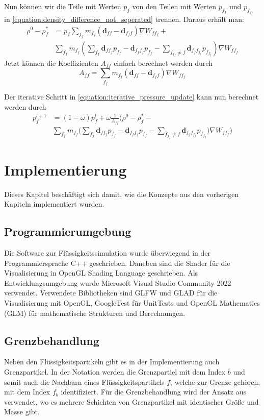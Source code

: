 \documentclass{scrreprt}
\begin{document}
Nun können wir die Teile mit Werten $p_f$ von den Teilen mit Werten $p_{f_f}$ und $p_{f_{f_f}}$ in \eqref{equation:density_difference_not_seperated} trennen.  
Daraus erhält man:
\begin{align}
    \rho^0 - \rho_f^* &= p_f \sum_{f_f} m_{f_f} \left(\textbf{d}_{ff} - \textbf{d}_{f_f f}\right)  \nabla W_{ff_f} +\\
    & \sum_{f_f} m_{f_f} \left(\sum_{f_f} \textbf{d}_{ff_f} p_{f_f} -
    \textbf{d}_{f_f f_f} p_{f_f} - \sum_{f_{f_f} \neq f} \textbf{d}_{f_f f_{f_f}} p_{f_{f_f}} \right) \nabla W_{ff_f}
\end{align}
Jetzt können die Koeffizienten $A_{ff}$ einfach berechnet werden durch
\begin{equation}
    A_{ff} = \sum_{f_f} m_{f_f} \left(\textbf{d}_{ff} - \textbf{d}_{f_f f}\right)  \nabla W_{ff_f}
\end{equation}

Der iterative Schritt in \eqref{equation:iterative_pressure_update} kann nun berechnet werden durch
\begin{align}
    p_f^{l+1} &= (1 - \omega) p_f^l + \omega \frac{1}{A_{ff}} \Biggl(\rho^0 - \rho_f^* - \\
    &\sum_{f_f} m_{f_f} \biggl(\sum_{f_f} \textbf{d}_{ff_f} p_{f_f} -
    \textbf{d}_{f_f f_f} p_{f_f} - \sum_{f_{f_f} \neq f} \textbf{d}_{f_f f_{f_f}} p_{f_{f_f}} \biggr) \nabla W_{ff_f}\Biggr)
\end{align}


\chapter{Implementierung}
Dieses Kapitel beschäftigt sich damit, wie die Konzepte aus den vorherigen Kapiteln implementiert wurden.


\section{Programmierumgebung}
Die Software zur Flüssigkeitssimulation wurde überwiegend in der Programmiersprache C++ geschrieben.
Daneben sind die Shader für die Visualisierung in OpenGL Shading Language geschrieben.
Als Entwicklungsumgebung wurde Microsoft Visual Studio Community 2022 verwendet.
Verwendete Bibliotheken sind GLFW und GLAD für die Visualisierung mit OpenGL,
GoogleTest für UnitTests
und OpenGL Mathematics (GLM) für mathematische Strukturen und Berechnungen.


\section{Grenzbehandlung}
Neben den Flüssigkeitspartikeln gibt es in der Implementierung auch Grenzpartikel.
In der Notation werden die Grenzpartiel mit dem Index $b$ und somit auch die Nachbarn eines Flüssigkeitspartikels $f$,
welche zur Grenze gehören, mit dem Index $f_b$ identifiziert.
Für die Grenzbehandlung wird der Ansatz aus \cite{koschier_smoothed_2020} verwendet, wo es mehrere Schichten von Grenzpartikel mit identischer Größe und Masse gibt.
\end{document}
